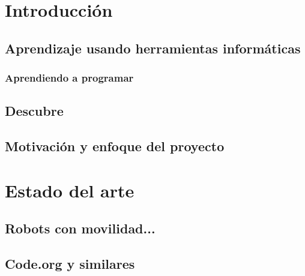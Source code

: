 


\chapter{Introducción}\label{introduccion}

\section{Aprendizaje usando herramientas informáticas}
\label{sec:aprendizaje}

\subsection{Aprendiendo a programar}
\label{sub:aprendiendo-programar}

\section{Descubre}
\label{sec:descubre}


\section{Motivación y enfoque del proyecto}
\label{sec:motivacion}


\chapter{Estado del arte}\label{estado-arte}


\section{Robots con movilidad...}
\label{sec:Robots con movilidad...}

\section{Code.org y similares}
\label{sec:Code.org y similares}



